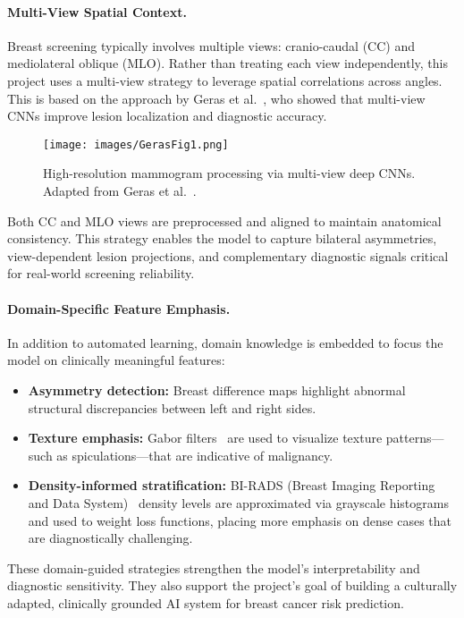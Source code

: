 \documentclass[12pt]{article}
\begin{document}
\paragraph{Multi-View Spatial Context.}
Breast screening typically involves multiple views: cranio-caudal (CC) and mediolateral oblique (MLO). Rather than treating each view independently, this project uses a multi-view strategy to leverage spatial correlations across angles. This is based on the approach by Geras et al.~\cite{8}, who showed that multi-view CNNs improve lesion localization and diagnostic accuracy.

\begin{figure}[H]
    \centering
    \texttt{[image: images/GerasFig1.png]}
    \caption{High-resolution mammogram processing via multi-view deep CNNs. Adapted from Geras et al.~\cite{8}.}
    \label{fig:geras}
\end{figure}

Both CC and MLO views are preprocessed and aligned to maintain anatomical consistency. This strategy enables the model to capture bilateral asymmetries, view-dependent lesion projections, and complementary diagnostic signals critical for real-world screening reliability.

\paragraph{Domain-Specific Feature Emphasis.}
In addition to automated learning, domain knowledge is embedded to focus the model on clinically meaningful features:

\begin{itemize}
    \item \textbf{Asymmetry detection:} Breast difference maps highlight abnormal structural discrepancies between left and right sides.
    \item \textbf{Texture emphasis:} Gabor filters~\cite{20} are used to visualize texture patterns—such as spiculations—that are indicative of malignancy.
    \item \textbf{Density-informed stratification:} BI-RADS (Breast Imaging Reporting and Data System)~\cite{16} density levels are approximated via grayscale histograms and used to weight loss functions, placing more emphasis on dense cases that are diagnostically challenging.
\end{itemize}

These domain-guided strategies strengthen the model’s interpretability and diagnostic sensitivity. They also support the project’s goal of building a culturally adapted, clinically grounded AI system for breast cancer risk prediction.
\end{document}
